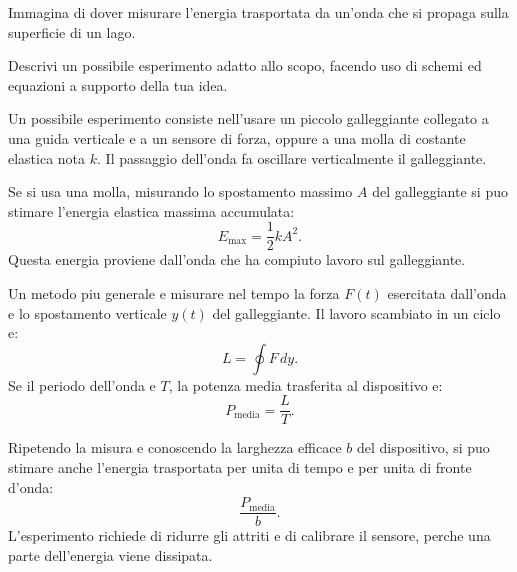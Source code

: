 
\begin{esercizio}
Immagina di dover misurare l'energia trasportata da un'onda che si propaga
sulla superficie di un lago.

Descrivi un possibile esperimento adatto allo scopo, facendo uso di schemi ed
equazioni a supporto della tua idea.
\end{esercizio}

\begin{soluzione}
Un possibile esperimento consiste nell'usare un piccolo galleggiante collegato
a una guida verticale e a un sensore di forza, oppure a una molla di costante
elastica nota \(k\). Il passaggio dell'onda fa oscillare verticalmente il
galleggiante.

Se si usa una molla, misurando lo spostamento massimo \(A\) del galleggiante si
puo stimare l'energia elastica massima accumulata:
\[
E_\text{max}=\frac{1}{2}kA^2.
\]
Questa energia proviene dall'onda che ha compiuto lavoro sul galleggiante.

Un metodo piu generale e misurare nel tempo la forza \(F(t)\) esercitata
dall'onda e lo spostamento verticale \(y(t)\) del galleggiante. Il lavoro
scambiato in un ciclo e:
\[
L=\oint F\,dy.
\]
Se il periodo dell'onda e \(T\), la potenza media trasferita al dispositivo e:
\[
P_\text{media}=\frac{L}{T}.
\]

Ripetendo la misura e conoscendo la larghezza efficace \(b\) del dispositivo,
si puo stimare anche l'energia trasportata per unita di tempo e per unita di
fronte d'onda:
\[
\frac{P_\text{media}}{b}.
\]
L'esperimento richiede di ridurre gli attriti e di calibrare il sensore, perche
una parte dell'energia viene dissipata.
\end{soluzione}
